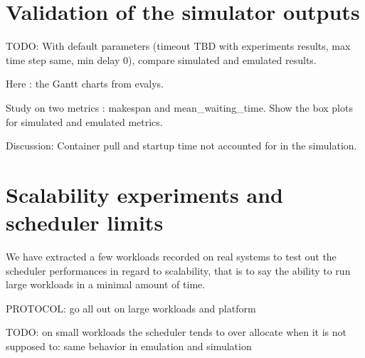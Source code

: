 \section{Validation of the simulator outputs}

TODO: With default parameters (timeout TBD with experiments results, max time step same, min delay 0), compare simulated and emulated results. 

Here : the Gantt charts from evalys.

Study on two metrics : makespan and mean\_waiting\_time. Show the box plots for
simulated and emulated metrics.

Discussion:
Container pull and startup time not accounted for in the simulation.

\section{Scalability experiments and scheduler limits}

We have extracted a few workloads recorded on real systems to test out the
scheduler performances in regard to scalability, that is to say the ability to
run large workloads in a minimal amount of time.

PROTOCOL: go all out on large workloads and platform

TODO: on small workloads the scheduler tends to over allocate when it is not supposed
to: same behavior in emulation and simulation


\newpage
